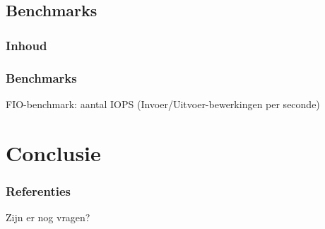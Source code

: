 \documentclass{beamer}
\begin{document}

\subsection{Benchmarks}


\begin{frame}
  \frametitle{Inhoud}
  \tableofcontents
\end{frame}


\begin{frame}
  \frametitle{Benchmarks}
  FIO-benchmark: aantal IOPS (Invoer/Uitvoer-bewerkingen per seconde)
  
\end{frame}

\section{Conclusie}


\begin{frame}[allowframebreaks]
  \frametitle{Referenties}
  \printbibliography
\end{frame}


\begin{frame}
\Huge{\centerline{Zijn er nog vragen?}}
\end{frame}

\end{document}

